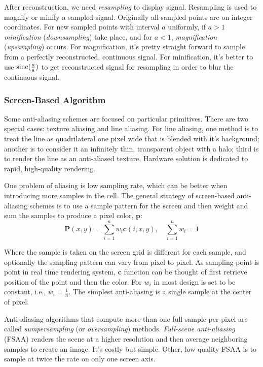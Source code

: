 \documentclass[10pt, a4paper]{article}
\begin{document}
            After reconstruction, we need \emph{resampling} to display signal. Resampling is used to magnify or minify a sampled signal. Originally all sampled points are on integer coordinates. For new sampled points with interval $a$ uniformly, if $a > 1$ \emph{minification} (\emph{downsampling}) take place, and for $a < 1$, \emph{magnification} (\emph{upsampling}) occurs. For magnification, it's pretty straight forward to sample from a perfectly reconstructed, continuous signal. For minification, it's better to use $\rm{sinc}(\frac{x}{a})$ to get reconstructed signal for resampling in order to blur the continuous signal.

            \subsubsection{Screen-Based Algorithm}
                Some anti-aliasing schemes are focused on particular primitives. There are two special cases: texture aliasing and line aliasing. For line aliasing, one method is to treat the line as quadrilateral one pixel wide that is blended with it's background; another is to consider it an infinitely thin, transparent object with a halo; third is to render the line as an anti-aliased texture. Hardware solution is dedicated to rapid, high-quality rendering. 

                One problem of aliasing is low sampling rate, which can be better when introducing more samples in the cell. The general strategy of screen-based anti-aliasing schemes is to use a sample pattern for the screen and then weight and sum the samples to produce a pixel color, $\textbf{p}$: 
                    $$\textbf{P}(x, y) = \sum_{i = 1}^nw_i\textbf{c}(i,x,y),\quad \sum_{i = 1}^nw_i = 1$$
                
                    Where the sample is taken on the screen grid is different for each sample, and optionally the sampling pattern can vary from pixel to pixel. As sampling point is point in real time rendering system, $\textbf{c}$ function can be thought of first retrieve position of the point and then the color. For $w_i$ in most design is set to be constant, i.e., $w_i = \frac{1}{n}$. The simplest anti-aliasing is a single sample at the center of pixel. 

                    Anti-aliasing algorithms that compute more than one full sample per pixel are called \emph{sumpersampling} (or \emph{oversampling}) methods. \emph{Full-scene anti-aliasing} (FSAA) renders the scene at a higher resolution and then average neighboring samples to create an image. It's costly but simple. Other, low quality FSAA is to sample at twice the rate on only one screen axis. 
\end{document}
